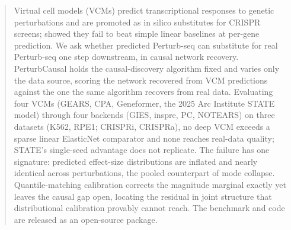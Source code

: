 \documentclass{article}
\theoremstyle{plain}
\theoremstyle{definition}
\theoremstyle{remark}
\begin{document}


\printAffiliationsAndNotice{} %

\begin{abstract}
Virtual cell models (VCMs) predict transcriptional responses to genetic perturbations and are promoted as in silico substitutes for CRISPR screens; \citet{ahlmanneltze2025} showed they fail to beat simple linear baselines at per-gene prediction. We ask whether predicted Perturb-seq can substitute for real Perturb-seq one step downstream, in causal network recovery. PerturbCausal holds the causal-discovery algorithm fixed and varies only the data source, scoring the network recovered from VCM predictions against the one the same algorithm recovers from real data. Evaluating four VCMs (GEARS, CPA, Geneformer, the 2025 Arc Institute STATE model) through four backends (GIES, inspre, PC, NOTEARS) on three datasets (K562, RPE1; CRISPRi, CRISPRa), no deep VCM exceeds a sparse linear ElasticNet comparator and none reaches real-data quality; STATE's single-seed advantage does not replicate. The failure has one signature: predicted effect-size distributions are inflated and nearly identical across perturbations, the pooled counterpart of mode collapse. Quantile-matching calibration corrects the magnitude marginal exactly yet leaves the causal gap open, locating the residual in joint structure that distributional calibration provably cannot reach. The benchmark and code are released as an open-source package.
\end{abstract}
\end{document}
